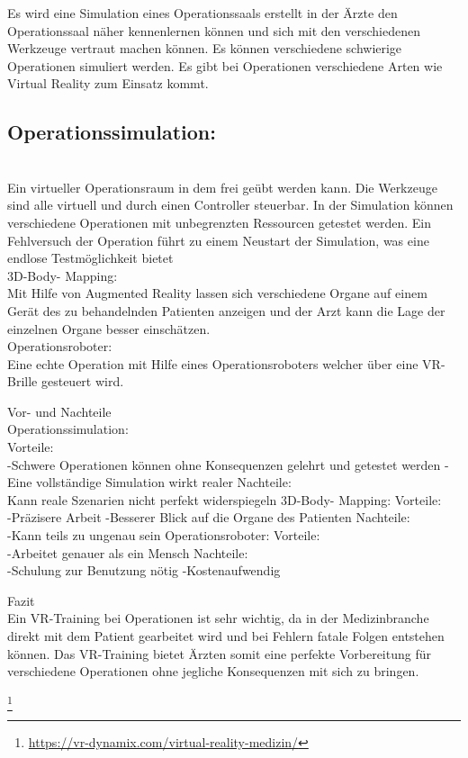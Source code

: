 
Es wird eine Simulation eines Operationssaals erstellt in der Ärzte den Operationssaal näher kennenlernen können und sich mit den verschiedenen Werkzeuge vertraut machen können. Es können verschiedene schwierige Operationen simuliert werden. Es gibt bei Operationen verschiedene Arten wie Virtual Reality zum Einsatz kommt.\\
\subsection{Operationssimulation:}\\
Ein virtueller Operationsraum in dem frei geübt werden kann. Die Werkzeuge sind alle virtuell und durch einen Controller steuerbar. In der Simulation können verschiedene Operationen mit unbegrenzten Ressourcen getestet werden. Ein Fehlversuch der Operation führt zu einem Neustart der Simulation, was eine endlose Testmöglichkeit bietet\\
3D-Body- Mapping:\\
Mit Hilfe von Augmented Reality lassen sich verschiedene Organe auf einem Gerät des zu behandelnden Patienten anzeigen und der Arzt kann die Lage der einzelnen Organe besser einschätzen.\\   \cite{mehlitz1998virtual}
Operationsroboter:\\
Eine echte Operation mit Hilfe eines Operationsroboters welcher über eine VR-Brille gesteuert wird.

Vor- und Nachteile\\
Operationssimulation:\\
Vorteile:\\
-Schwere Operationen
können ohne Konsequenzen gelehrt und getestet werden
-Eine vollständige Simulation wirkt realer
Nachteile:\\
Kann reale Szenarien nicht perfekt widerspiegeln
3D-Body- Mapping:
Vorteile:\\
-Präzisere Arbeit
-Besserer Blick auf die Organe des Patienten
Nachteile:\\
-Kann teils zu ungenau sein
Operationsroboter:
Vorteile:\\
-Arbeitet genauer als ein Mensch
Nachteile:\\
-Schulung zur Benutzung nötig
-Kostenaufwendig

Fazit\\
Ein VR-Training bei Operationen ist sehr wichtig, da in der Medizinbranche direkt mit dem Patient gearbeitet wird und bei Fehlern fatale Folgen entstehen können. Das VR-Training bietet Ärzten somit eine perfekte Vorbereitung für verschiedene Operationen ohne jegliche Konsequenzen mit sich zu bringen.


\footnote{\url{https://vr-dynamix.com/virtual-reality-medizin/}}

